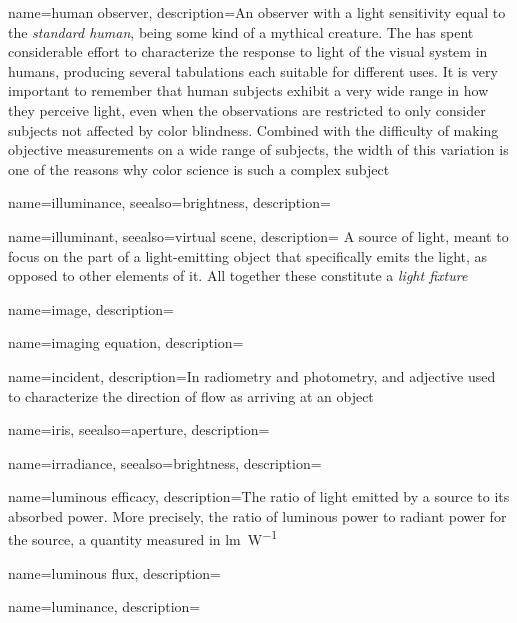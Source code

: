 {    
	name={human observer},
	description={An observer with a light sensitivity equal to the \textsl{standard human},
		being some kind of a mythical creature.
		The  has spent considerable effort to characterize the response to light 
		of the visual system in humans, producing several tabulations each suitable for
		different uses. 
		It is very important to remember that human subjects exhibit a very wide range 
		in how they perceive light, even when the observations are restricted to only 
		consider subjects not affected by color blindness.
		Combined with the difficulty of making objective measurements on a wide range 
		of subjects, the width of this variation is one of the reasons why color science is
		such a complex subject}
}

{
	name=illuminance,
	seealso={brightness},
	description=\nopostdesc
}

{
	name=illuminant,
	seealso={virtual scene},
	description={
		A source of light, meant to focus on the part of a light-emitting object that
	    specifically emits the light, as opposed to other elements of it. All together
        these constitute a \textsl{light fixture}}
}

{
	name={image},
	description=\nopostdesc
}

{
	name={imaging equation},
	description=\nopostdesc
}
	
{
	name={incident},
	description={In radiometry and photometry, and adjective used to characterize the direction of
		flow as arriving at an object}
}

{
	name=iris,
	seealso={aperture},
	description=\nopostdesc
}

{
	name=irradiance,
	seealso={brightness},
	description=\nopostdesc
}

{
	name={luminous efficacy},
	description={The ratio of light emitted by a source to its absorbed power.
		More precisely, the ratio of luminous power to radiant power for the source,
		a quantity measured in \unit{\lumen\per\watt}}
}

{
	name={luminous flux},
	description=\nopostdesc
}

{
	name={luminance},
	description=\nopostdesc
}

